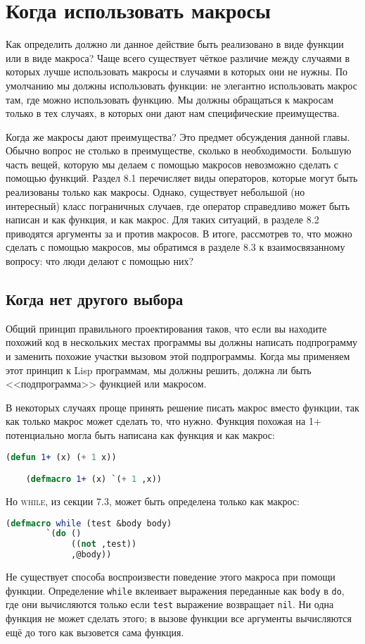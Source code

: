 \documentclass[12pt, a4paper]{article} %
\begin{document}
\section{Когда использовать макросы}

Как определить должно ли данное действие быть реализовано в виде функции или в виде макроса? Чаще всего существует чёткое различие между случаями в которых лучше использовать макросы и случаями в которых они не нужны. По умолчанию мы должны использовать функции: не элегантно использовать макрос там, где можно использовать функцию. Мы должны обращаться к макросам только в тех случаях, в которых они дают нам специфические преимущества. 

Когда же макросы дают преимущества? Это предмет обсуждения данной главы. Обычно вопрос не столько в преимуществе, сколько в необходимости. Большую часть вещей, которую мы делаем с помощью макросов невозможно сделать с помощью функций. Раздел 8.1 перечисляет виды операторов, которые могут быть реализованы только как макросы. Однако, существует небольшой (но интересный) класс пограничных случаев, где оператор справедливо может быть написан и как функция, и как макрос. Для таких ситуаций, в разделе 8.2 приводятся аргументы за и против макросов. В итоге, рассмотрев то, что можно сделать с помощью макросов, мы обратимся в разделе 8.3 к взаимосвязанному вопросу: что люди делают с помощью них?

\subsection{Когда нет другого выбора}

Общий принцип правильного проектирования таков, что если вы находите похожий код в нескольких местах программы вы должны написать подпрограмму и заменить похожие участки вызовом этой подпрограммы. Когда мы применяем этот принцип к Lisp программам, мы должны решить, должна ли быть <<подпрограмма>> функцией или макросом.

В некоторых случаях проще принять решение писать макрос вместо функции, так как только макрос может сделать то, что нужно. Функция похожая на \textsc{1+} потенциально могла быть написана как функция и как макрос:
\begin{lstlisting}[language=Lisp]
    (defun 1+ (x) (+ 1 x))

    (defmacro 1+ (x) `(+ 1 ,x))
\end{lstlisting}
Но \textsc{while}, из секции 7.3, может быть определена только как макрос:
\begin{lstlisting}[language=Lisp]
    (defmacro while (test &body body)
        `(do ()
             ((not ,test))
             ,@body))
\end{lstlisting}
Не существует способа воспроизвести поведение этого макроса при помощи функции. Определение \texttt{while} вклеивает выражения переданные как \texttt{body} в \texttt{do}, где они вычисляются только если \texttt{test} выражение возвращает \texttt{nil}. Ни одна функция не может сделать этого; в вызове функции все аргументы вычисляются ещё до того как вызовется сама функция.
\end{document}

